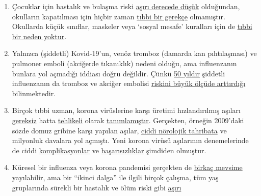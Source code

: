 \begin{enumerate}
\item
  Çocuklar için hastalık ve bulaşma riski
  \href{https://thehill.com/opinion/education/500349-science-says-open-the-schools}{aşırı
  derecede düşük} olduğundan, okulların kapatılması için hiçbir zaman
  \href{https://www.thelancet.com/journals/lanchi/article/PIIS2352-4642(20)30095-X/fulltext}{tıbbi
  bir gerekçe} olmamıştır. Okullarda küçük sınıflar, maskeler veya
  `sosyal mesafe' kuralları için de
  \href{https://www.welt.de/politik/deutschland/article208075525/Corona-Kitas-und-Grundschulen-vollstaendig-oeffnen-uneingeschraenkt.html}{tıbbi
  bir neden yoktur}.
\item
  Yalnızca (şiddetli) Kovid-19'un, venöz tromboz (damarda kan
  pıhtılaşması) ve pulmoner emboli (akciğerde tıkanıklık) nedeni olduğu,
  ama influenzanın bunlara yol açmadığı iddiası doğru değildir. Çünkü
  \href{https://www.thieme-connect.com/products/ejournals/abstract/10.1055/s-0028-1108874}{50
  yıldır} şiddetli influenzanın da tromboz ve akciğer embolisi
  \href{https://www.sciencedaily.com/releases/2009/10/091014111549.htm}{riskini
  büyük ölçüde arttırdığı} bilinmektedir.
\item
  Birçok tıbbi uzman, korona virüslerine karşı üretimi hızlandırılmış
  aşıları \href{https://www.youtube.com/watch?v=vrL9QKGQrWk}{gereksiz}
  hatta
  \href{https://www.nature.com/articles/d41586-020-00751-9}{tehlikeli}
  olarak
  \href{https://www.news.com.au/lifestyle/health/health-problems/no-vaccine-for-coronavirus-a-possibility/news-story/34e678ae205b50ea983cc64ab2943608}{tanımlamıştır}.
  Gerçekten, örneğin 2009'daki sözde domuz gribine karşı yapılan aşılar,
  \href{https://www.ibtimes.co.uk/brain-damaged-uk-victims-swine-flu-vaccine-get-60-million-compensation-1438572}{ciddi
  nörolojik tahribata} ve milyonluk davalara yol açmıştı. Yeni korona
  virüsü aşılarının denemelerinde de ciddi
  \href{https://childrenshealthdefense.org/news/vaccine-trial-catastrophe-moderna-vaccine-has-20-serious-injury-rate-in-high-dose-group/}{komplikasyonlar}
  ve
  \href{https://www.forbes.com/sites/williamhaseltine/2020/05/16/did-the-oxford-covid-vaccine-work-in-monkeys-not-really/}{başarısızlıklar}
  şimdiden olmuştur.
\item
  Küresel bir influenza veya korona pandemisi gerçekten de
  \href{https://www.britannica.com/event/1968-flu-pandemic}{birkaç
  mevsime} yayılabilir, ama bir ``ikinci dalga'' ile ilgili birçok
  çalışma, tüm yaş gruplarında sürekli bir hastalık ve ölüm riski gibi
  \href{https://www.heise.de/tp/features/Fellay-Studie-Zweite-Corona-Welle-4726303.html}{aşırı
}
\end{enumerate}
